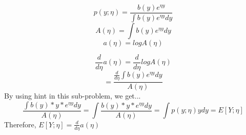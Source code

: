 \begin{answer}
  \begin{equation*}
      p(y;\eta) = \frac{b(y)e^{\eta y}}{\int b(y)e^{\eta y} dy}
\end{equation*}
\begin{equation*}
      A(\eta) = \int b(y)e^{\eta y} dy
\end{equation*}
\begin{equation*}
      a(\eta) = log A(\eta)
  \end{equation*}
  
  \begin{equation*}
      \frac{d}{d\eta}a(\eta) = \frac{d}{d\eta}log A(\eta)
  \end{equation*}
  \begin{equation*}
      = \frac{\frac{d}{d\eta}\int b(y)e^{\eta y} dy}{A(\eta)}  
  \end{equation*}
  By using hint in this sub-problem, we get...
  \begin{equation*}
      \frac{\int b(y)*y*e^{\eta y} dy}{A(\eta)} = \int\frac{ b(y)*y*e^{\eta y} dy}{A(\eta)} = \int p(y;\eta)y dy = E[Y;\eta]
  \end{equation*}
  Therefore, $E[Y;\eta] = \frac{d}{d\eta}a(\eta)$
\end{answer}
